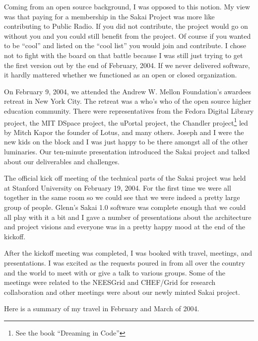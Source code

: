 \documentclass[12pt]{book}
\begin{document}
Coming from an open source background, I was opposed to this notion.
My view was that paying for a membership in the Sakai Project was more
like contributing to Public Radio.  If you did not contribute, the project would
go on without you and you could still benefit from the project.  Of course
if you wanted to be ``cool'' and listed on the ``cool list'' you would join and
contribute.  I chose not to fight with the board on that battle because I
was still just trying to get the first version out by the end of February,
2004.  If we never delivered software, it hardly mattered whether we functioned
as an open or closed organization.

On February 9, 2004, we attended the Andrew W. Mellon Foundation's awardees retreat
in New York City.   The retreat was a who's who of the open source
higher education community.  There were representatives from the Fedora Digital
Library project, the MIT DSpace project, the uPortal project, the Chandler
project\footnote{See the book ``Dreaming in Code''} led by Mitch Kapor the founder
of Lotus, and many others.  Joseph and I were the new kids on the block and I
was just happy to be there amongst all of the other luminaries.
Our ten-minute presentation introduced the Sakai project and talked about our deliverables
and challenges.

The official kick off meeting of the technical parts of the Sakai project was
held at Stanford University on February 19, 2004.  For the first time we were
all together in the same room so we could see that we were indeed a pretty
large group of people.  Glenn's Sakai 1.0 software was complete enough that we could
all play with it a bit and I gave a number of presentations about the architecture and
project visions and everyone was in a pretty happy mood at the end of the kickoff.

After the kickoff meeting was completed, I was booked with travel, meetings,
and presentations.  I was excited as the requests poured in from all over the country
and the world to meet with or give a talk to various groups.  Some of the meetings
were related to the NEESGrid and CHEF\slash Grid for research collaboration and other
meetings were about our newly minted Sakai project.

Here is a summary of my travel in February and March of 2004.
\end{document}
